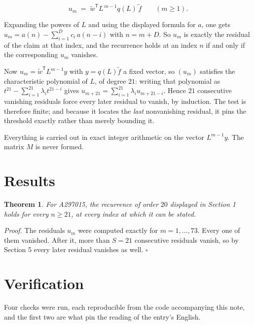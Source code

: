 \documentclass[11pt]{article}
\newtheorem{theorem}{Theorem}
\theoremstyle{definition}
\begin{document}
\[u_m \;=\; \tilde w^{\mathsf T} L^{\,m-1} q(L)\,\tilde f \qquad (m \ge 1).\]

Expanding the powers of $L$ and using the displayed formula for $a$, one gets $u_m = a(n) - \sum_{i=1}^{D} c_i\,a(n-i)$ with $n = m + D$. So $u_m$ is exactly the residual of the claim at that index, and the recurrence holds at an index $n$ if and only if the corresponding $u_m$ vanishes.

Now $u_m = \tilde w^{\mathsf T} L^{m-1} y$ with $y = q(L)\tilde f$ a fixed vector, so $(u_m)$ satisfies the characteristic polynomial of $L$, of degree $21$: writing that polynomial as $t^{21} - \sum_{i=1}^{21} \lambda_i t^{21-i}$ gives $u_{m+21} = \sum_{i=1}^{21} \lambda_i u_{m+21-i}$. Hence $21$ consecutive vanishing residuals force every later residual to vanish, by induction. The test is therefore finite; and because it locates the {\itshape last} nonvanishing residual, it pins the threshold exactly rather than merely bounding it.

Everything is carried out in exact integer arithmetic on the vector $L^{m-1}y$. The matrix $M$ is never formed.

\section{Results}

\begin{theorem} For A297015, the recurrence of order $20$ displayed in Section 1 holds for every $n \ge 21$, at every index at which it can be stated.\end{theorem}

{\itshape Proof.} The residuals $u_m$ were computed exactly for $m = 1,\dots,73$. Every one of them vanished. After it, more than $S = 21$ consecutive residuals vanish, so by Section 5 every later residual vanishes as well. $\square$

\section{Verification}

Four checks were run, each reproducible from the code accompanying this note, and the first two are what pin the reading of the entry's English.
\end{document}

